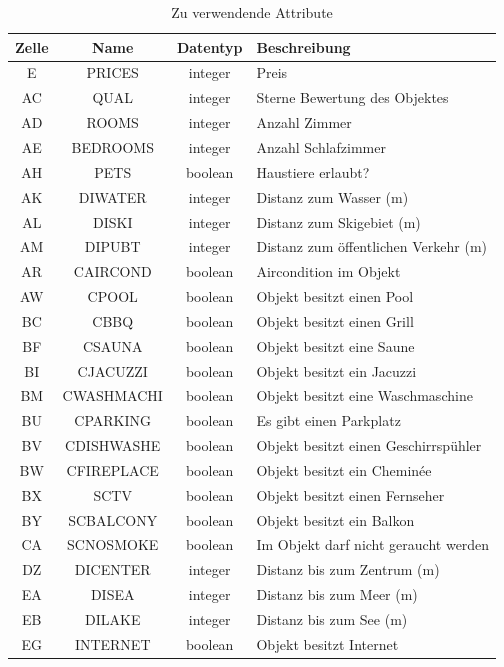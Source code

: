 \begin{table}[H] 
	\caption{Zu verwendende Attribute}
	\centering
		\label{fig:recherche:attributeinschraenkung:2}
	\begin{tabular}{ | c | c | c | l |} 
		\hline 
		\rowcolor{tableheadcolor}
		\bfseries Zelle & \bfseries Name & \bfseries Datentyp & \bfseries Beschreibung \\ \hline 
		E & PRICES & integer & Preis \\ \hline 
		AC & QUAL & integer & Sterne Bewertung des Objektes \\ \hline 
		AD & ROOMS & integer & Anzahl Zimmer \\ \hline 
		AE & BEDROOMS & integer & Anzahl Schlafzimmer \\ \hline 
		AH & PETS & boolean & Haustiere erlaubt? \\ \hline 
		AK & DIWATER & integer & Distanz zum Wasser (m) \\ \hline 
		AL & DISKI & integer & Distanz zum Skigebiet (m) \\ \hline 
		AM & DIPUBT & integer & Distanz zum öffentlichen Verkehr (m) \\ \hline 
		AR & CAIRCOND & boolean & Aircondition im Objekt\\ \hline 
		AW & CPOOL & boolean & Objekt besitzt einen Pool \\ \hline 
		BC & CBBQ & boolean & Objekt besitzt einen Grill \\ \hline 
		BF & CSAUNA & boolean & Objekt besitzt eine Saune \\ \hline 
		BI & CJACUZZI & boolean & Objekt besitzt ein Jacuzzi \\ \hline 
		BM & CWASHMACHI & boolean & Objekt besitzt eine Waschmaschine \\ \hline 
		BU & CPARKING & boolean & Es gibt einen Parkplatz \\ \hline 
		BV & CDISHWASHE & boolean & Objekt besitzt einen Geschirrspühler \\ \hline
		BW & CFIREPLACE & boolean & Objekt besitzt ein Cheminée \\ \hline 
		BX & SCTV & boolean & Objekt besitzt einen Fernseher \\ \hline  
		BY & SCBALCONY & boolean & Objekt besitzt ein Balkon \\ \hline 
		CA & SCNOSMOKE & boolean & Im Objekt darf nicht geraucht werden \\ \hline 
		DZ & DICENTER & integer & Distanz bis zum Zentrum (m) \\ \hline 
		EA & DISEA & integer & Distanz bis zum Meer (m) \\ \hline 
		EB & DILAKE & integer & Distanz bis zum See (m) \\ \hline 
		EG & INTERNET & boolean & Objekt besitzt Internet \\ \hline 
	\end{tabular}
\end{table}

